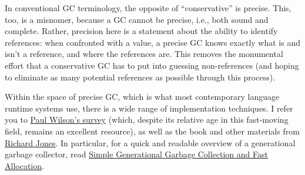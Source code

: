 
In conventional GC terminology, the opposite of “conservative” is precise. This,
too, is a misnomer, because a GC cannot be precise, i.e., both sound and
complete. Rather, precision here is a statement about the ability to identify
references: when confronted with a value, a precise GC knows exactly what is and
isn’t a reference, and where the references are. This removes the monumental
effort that a conservative GC has to put into guessing non-references (and
hoping to eliminate as many potential references as possible through this
process).

Within the space of precise GC, which is what most contemporary language runtime
systems use, there is a wide range of implementation techniques. I refer you to
\href{ftp://ftp.cs.utexas.edu/pub/garbage/gcsurvey.ps}{Paul Wilson’s survey}
(which, despite its relative age in this fast-moving field, remains an excellent
resource), as well as the book and other materials from
\href{https://www.cs.kent.ac.uk/people/staff/rej/gc.html}{Richard Jones}. In
particular, for a quick and readable overview of a generational garbage
collector, read \href{http://www.cs.princeton.edu/~appel/papers/143.ps}{Simple
Generational Garbage Collection and Fast Allocation}.
